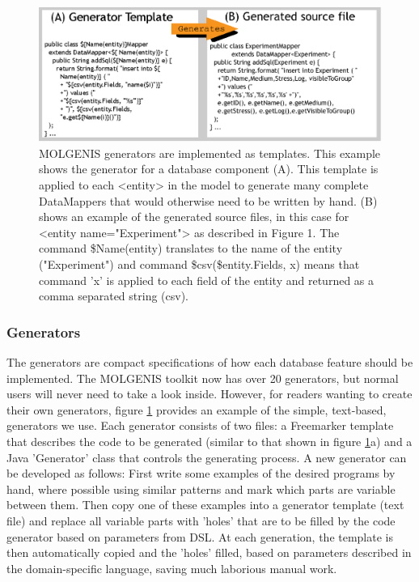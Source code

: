 \begin{figure}[h!]
  \centering
  \includegraphics[width=1.0\textwidth]{eps/image_5_2.eps}
  \caption[Templates]
    {MOLGENIS generators are implemented as templates. This example shows the generator for a database component 
    (A). This template is applied to each <entity> in the model to generate many complete DataMappers that would 
    otherwise need to be written by hand. (B) shows an example of the generated source files, in this case for 
    <entity name="Experiment"> as described in Figure 1. The command \$Name(entity) translates to the name of the 
    entity ("Experiment") and command \${csv(\$entity.Fields, x)} means that command 'x' is applied to each field 
    of the entity and returned as a comma separated string (csv).}
	\label{fig:Generators}
\end{figure}

\subsubsection{Generators}
The generators are compact specifications of how each database feature should be implemented. 
The MOLGENIS toolkit now has over 20 generators, but normal users will never need to take a look 
inside. However, for readers wanting to create their own generators, figure \ref{fig:Generators} provides an example 
of the simple, text-based, generators we use. Each generator consists of two files: a Freemarker 
template that describes the code to be generated (similar to that shown in figure \ref{fig:Generators}a) and a Java 
'Generator' class that controls the generating process. A new generator can be developed as 
follows: First write some examples of the desired programs by hand, where possible using similar 
patterns and mark which parts are variable between them. Then copy one of these examples into 
a generator template (text file) and replace all variable parts with 'holes' that 
are to be filled by the code generator based on parameters from DSL. At each generation, the 
template is then automatically copied and the 'holes' filled, based on parameters described in 
the domain-specific language, saving much laborious manual work. 

